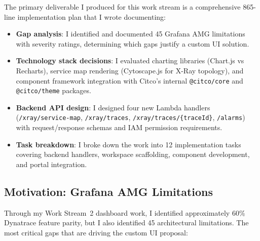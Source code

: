 The primary deliverable I produced for this work stream is a comprehensive
865-line implementation plan that I wrote documenting:

\begin{itemize}
    \item \textbf{Gap analysis}: I identified and documented 45 Grafana AMG limitations
          with severity ratings, determining which gaps justify a
          custom UI solution.

    \item \textbf{Technology stack decisions}: I evaluated charting
          libraries (Chart.js vs Recharts), service map rendering
          (Cytoscape.js for X-Ray topology), and component framework
          integration with Citco's internal \texttt{@citco/core} and
          \texttt{@citco/theme} packages.

    \item \textbf{Backend API design}: I designed four new Lambda handlers
          (\texttt{/xray/service-map}, \texttt{/xray/traces},
          \texttt{/xray/traces/\{traceId\}}, \texttt{/alarms}) with
          request/response schemas and IAM permission requirements.

    \item \textbf{Task breakdown}: I broke down the work into 12 implementation tasks covering
          backend handlers, workspace scaffolding, component development,
          and portal integration.
\end{itemize}

\subsection{Motivation: Grafana AMG Limitations}

Through my Work Stream~2 dashboard work, I identified approximately
60\% Dynatrace feature parity, but I also identified 45 architectural limitations.
The most critical gaps that are driving the custom UI proposal:

